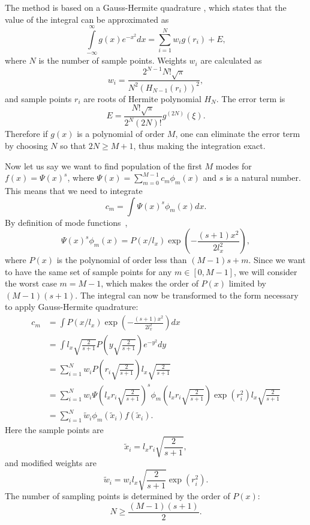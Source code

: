 The method is based on a Gauss-Hermite quadrature ,
which states that the value of the integral can be approximated as
\[
    \int\limits_{-\infty}^{\infty} g(x) e^{-x^2} dx
    = \sum_{i=1}^N w_i g(r_i) + E,
\]
where $N$ is the number of sample points.
Weights $w_i$ are calculated as
\[
    w_i = \frac{2^{N-1} N! \sqrt{\pi}}{N^2 (H_{N-1}(r_i))^2},
\]
and sample points $r_i$ are roots of Hermite polynomial $H_N$.
The error term is
\[
    E = \frac{N! \sqrt{\pi}}{2^N (2N)!} g^{(2N)}(\xi).
\]
Therefore if $g(x)$ is a polynomial of order $M$,
one can eliminate the error term by choosing $N$ so that $2N \ge M + 1$,
thus making the integration exact.

Now let us say we want to find population of the first $M$ modes for $f(x) = \Psi(x)^s$,
where $\Psi(x) = \sum_{m=0}^{M-1} c_m \phi_m(x)$ and $s$ is a natural number.
This means that we need to integrate
\[
    c_m = \int \Psi(x)^s \phi_m(x) dx.
\]
By definition of mode functions~,
\[
    \Psi(x)^s \phi_m(x) = P(x / l_x) \exp \left( -\frac{(s+1) x^2}{2 l_x^2} \right),
\]
where $P(x)$ is the polynomial of order less than $(M-1)s + m$.
Since we want to have the same set of sample points for any $m \in [0, M-1]$,
we will consider the worst case $m = M-1$,
which makes the order of $P(x)$ limited by $(M-1)(s+1)$.
The integral can now be transformed to the form necessary to apply Gauss-Hermite quadrature:
\begin{equation*}
\begin{split}
    c_m
    & = \int P(x / l_x) \exp \left( -\frac{(s+1) x^2}{2 l_x^2} \right) dx \\
    & = \int l_x \sqrt{\frac{2}{s+1}} P \left( y \sqrt{\frac{2}{s+1}} \right) e^{-y^2} dy \\
    & = \sum_{i=1}^N w_i P \left( r_i \sqrt{\frac{2}{s+1}} \right) l_x \sqrt{\frac{2}{s+1}} \\
    & = \sum_{i=1}^N w_i
        \Psi \left( l_x r_i \sqrt{\frac{2}{s+1}} \right)^s
        \phi_m \left( l_x r_i \sqrt{\frac{2}{s+1}} \right)
        \exp(r_i^2) l_x \sqrt{\frac{2}{s+1}} \\
    & = \sum_{i=1}^N \tilde{w}_i \phi_m(\tilde{x}_i) f(\tilde{x}_i).
\end{split}
\end{equation*}
Here the sample points are
\[
    \tilde{x}_i = l_x r_i \sqrt{\frac{2}{s+1}},
\]
and modified weights are
\[
    \tilde{w}_i = w_i l_x \sqrt{\frac{2}{s+1}} \exp(r_i^2).
\]
The number of sampling points is determined by the order of $P(x)$:
\[
    N \ge \frac{(M - 1)(s + 1)}{2}.
\]

